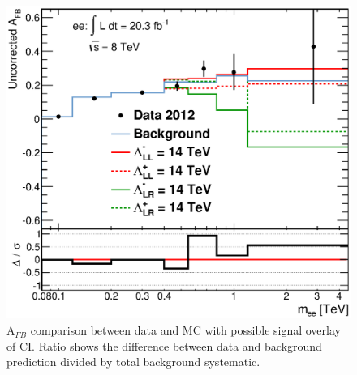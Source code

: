 	\begin{figure}[h]
	    \begin{center}
	    	\includegraphics[width=0.8\linewidth]{images/A_fb_main.eps}
	    \end{center}
	   \caption{A$_{FB}$ comparison between data and MC with possible signal overlay of CI. Ratio shows the difference between data and background prediction divided by total background systematic.}
	   \label{fig:AFB_main}
	\end{figure}



